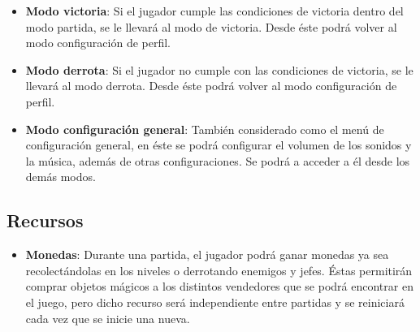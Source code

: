 \begin{itemize}
    \item \textbf{Modo victoria}: Si el jugador cumple las condiciones de
    victoria dentro del modo partida, se le llevará al modo de victoria. Desde
    éste podrá volver al modo configuración de perfil.

    \item \textbf{Modo derrota}: Si el jugador no cumple con las condiciones de
    victoria, se le llevará al modo derrota. Desde éste podrá volver al modo
    configuración de perfil.

    \item \textbf{Modo configuración general}: También considerado como el
    menú de configuración general, en éste se podrá configurar el volumen de
    los sonidos y la música, además de otras configuraciones. Se podrá a acceder
    a él desde los demás modos.
\end{itemize}


\subsection{Recursos}

\begin{itemize}
    \item \textbf{Monedas}: Durante una partida, el jugador podrá ganar monedas
    ya sea recolectándolas en los niveles o derrotando enemigos y jefes. Éstas
    permitirán comprar objetos mágicos a los distintos vendedores que se podrá
    encontrar en el juego, pero dicho recurso será independiente entre partidas
    y se reiniciará cada vez que se inicie una nueva.
\end{itemize}
